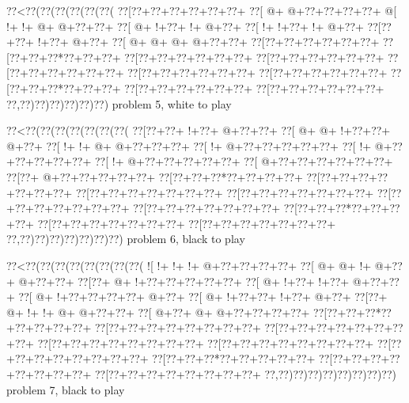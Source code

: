 \vbox{\vbox{\goo
\0??<\0??(\0??(\0??(\0??(\0??(\0??(
\0??[\0??+\0??+\0??+\0??+\0??+\0??+
\0??[\- @+\- @+\0??+\0??+\0??+\0??+
\- @[\- !+\- !+\- @+\- @+\0??+\0??+
\0??[\- @+\- !+\0??+\- !+\- @+\0??+
\0??[\- !+\- !+\0??+\- !+\- @+\0??+
\0??[\0??+\0??+\- !+\0??+\- @+\0??+
\0??[\- @+\- @+\- @+\- @+\0??+\0??+
\0??[\0??+\0??+\0??+\0??+\0??+\0??+
\0??[\0??+\0??+\0??*\0??+\0??+\0??+
\0??[\0??+\0??+\0??+\0??+\0??+\0??+
\0??[\0??+\0??+\0??+\0??+\0??+\0??+
\0??[\0??+\0??+\0??+\0??+\0??+\0??+
\0??[\0??+\0??+\0??+\0??+\0??+\0??+
\0??[\0??+\0??+\0??+\0??+\0??+\0??+
\0??[\0??+\0??+\0??*\0??+\0??+\0??+
\0??[\0??+\0??+\0??+\0??+\0??+\0??+
\0??[\0??+\0??+\0??+\0??+\0??+\0??+
\0??,\0??)\0??)\0??)\0??)\0??)\0??)
}
\hfil problem 5, white to play\hfil\break
}

\vbox{\vbox{\goo
\0??<\0??(\0??(\0??(\0??(\0??(\0??(\0??(
\0??[\0??+\0??+\- !+\0??+\- @+\0??+\0??+
\0??[\- @+\- @+\- !+\0??+\0??+\- @+\0??+
\0??[\- !+\- !+\- @+\- @+\0??+\0??+\0??+
\0??[\- !+\- @+\0??+\0??+\0??+\0??+\0??+
\0??[\- !+\- @+\0??+\0??+\0??+\0??+\0??+
\0??[\- !+\- @+\0??+\0??+\0??+\0??+\0??+
\0??[\- @+\0??+\0??+\0??+\0??+\0??+\0??+
\0??[\0??+\- @+\0??+\0??+\0??+\0??+\0??+
\0??[\0??+\0??+\0??*\0??+\0??+\0??+\0??+
\0??[\0??+\0??+\0??+\0??+\0??+\0??+\0??+
\0??[\0??+\0??+\0??+\0??+\0??+\0??+\0??+
\0??[\0??+\0??+\0??+\0??+\0??+\0??+\0??+
\0??[\0??+\0??+\0??+\0??+\0??+\0??+\0??+
\0??[\0??+\0??+\0??+\0??+\0??+\0??+\0??+
\0??[\0??+\0??+\0??*\0??+\0??+\0??+\0??+
\0??[\0??+\0??+\0??+\0??+\0??+\0??+\0??+
\0??[\0??+\0??+\0??+\0??+\0??+\0??+\0??+
\0??,\0??)\0??)\0??)\0??)\0??)\0??)\0??)
}
\hfil problem 6, black to play\hfil\break
}

\vbox{\vbox{\goo
\0??<\0??(\0??(\0??(\0??(\0??(\0??(\0??(\0??(
\- ![\- !+\- !+\- !+\- @+\0??+\0??+\0??+\0??+
\0??[\- @+\- @+\- !+\- @+\0??+\- @+\0??+\0??+
\0??[\0??+\- @+\- !+\0??+\0??+\0??+\0??+\0??+
\0??[\- @+\- !+\0??+\- !+\0??+\- @+\0??+\0??+
\0??[\- @+\- !+\0??+\0??+\0??+\0??+\- @+\0??+
\0??[\- @+\- !+\0??+\0??+\- !+\0??+\- @+\0??+
\0??[\0??+\- @+\- !+\- !+\- @+\- @+\0??+\0??+
\0??[\- @+\0??+\- @+\- @+\0??+\0??+\0??+\0??+
\0??[\0??+\0??+\0??*\0??+\0??+\0??+\0??+\0??+
\0??[\0??+\0??+\0??+\0??+\0??+\0??+\0??+\0??+
\0??[\0??+\0??+\0??+\0??+\0??+\0??+\0??+\0??+
\0??[\0??+\0??+\0??+\0??+\0??+\0??+\0??+\0??+
\0??[\0??+\0??+\0??+\0??+\0??+\0??+\0??+\0??+
\0??[\0??+\0??+\0??+\0??+\0??+\0??+\0??+\0??+
\0??[\0??+\0??+\0??*\0??+\0??+\0??+\0??+\0??+
\0??[\0??+\0??+\0??+\0??+\0??+\0??+\0??+\0??+
\0??[\0??+\0??+\0??+\0??+\0??+\0??+\0??+\0??+
\0??,\0??)\0??)\0??)\0??)\0??)\0??)\0??)\0??)
}
\hfil problem 7, black to play\hfil\break
}

